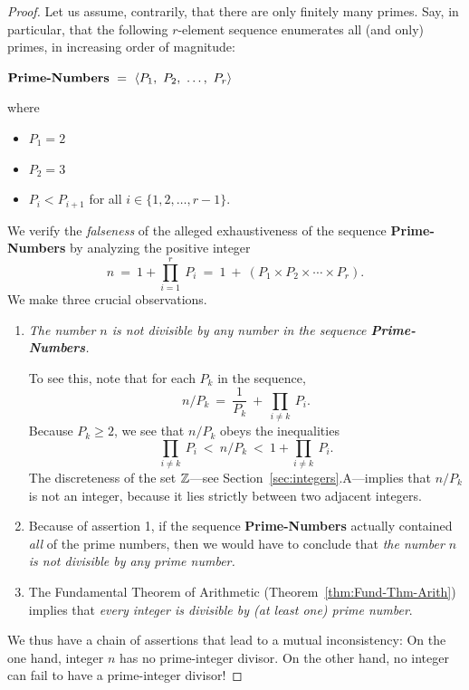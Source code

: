 \begin{proof}
Let us assume, contrarily, that there are only finitely many primes.  Say, in particular, that the following $r$-element sequence enumerates all (and only) primes, in increasing order of magnitude:

\medskip

$\mbox{\bf Prime-Numbers} \ = \ 
\langle P_1, \ P_2, \ \ldots, \ P_r \rangle$

\noindent where
\begin{itemize}
\item
$P_1 = 2$
\medskip\item
$P_2 = 3$
\medskip\item
$P_i < P_{i+1}$ for all $i \in \{1, 2, \ldots, r-1\}$.
\end{itemize}

\medskip

We verify the {\em falseness} of the alleged exhaustiveness of the sequence {\bf Prime-Numbers} by analyzing the positive integer
\[ n \ = \ 1 + \prod_{i=1}^r \ P_i \ = \ 1 \ + \ 
\left(P_1 \times P_2 \times \cdots \times P_r \right).
\]
We make three crucial observations.
\begin{enumerate}
\item
{\em The number $n$ is not divisible by any number in the sequence {\bf Prime-Numbers}.}

\smallskip

To see this, note that for each $P_k$ in the sequence,
\[
n / P_k \ = \ \frac{1}{P_k} \ + \ \prod_{i \neq k} \ P_i .
\]
Because $P_k \geq 2$, we see that $n / P_k$ obeys the inequalities
\[
\prod_{i \neq k} \ P_i \ < \ n/P_k \ < \ 1 + \prod_{i \neq k} \ P_i.
\] 
The discreteness of the set $\mathbb{Z}$---see Section~\ref{sec:integers}.A---implies that $n / P_k$ is not an integer, because it lies strictly between two adjacent integers.

\medskip\item
Because of assertion 1, if the sequence {\bf Prime-Numbers} actually contained {\em all} of the prime numbers, then we would have to conclude that {\em the number $n$ is not divisible by any prime number.}

\medskip\item
The Fundamental Theorem of Arithmetic (Theorem~\ref{thm:Fund-Thm-Arith}) implies that {\em every integer is divisible by (at least one) prime number}.
\end{enumerate}

We thus have a chain of assertions that lead to a mutual inconsistency: On the one hand, integer $n$ has no prime-integer divisor.  On the other hand, no integer can fail to have a prime-integer divisor!


\end{proof}
